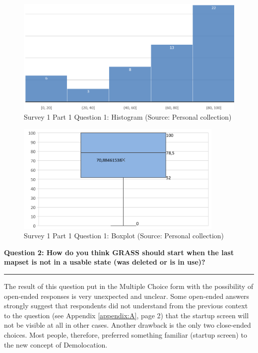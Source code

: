 \documentclass[a4paper,10pt,twoside]{article}
\begin{document}
\begin{figure}[hbt!] 
\begin{center}
\includegraphics[width=12cm]{../surveys/analyzed_data/survey1_part1_question1_excel_histogram.png} 
\caption[Survey 1 Part 1 Question 1: Histogram]{Survey 1 Part 1 Question 1: Histogram (Source: Personal collection)}
\label{fig:survey1_part1_question1_histogram}
\end{center}
\end{figure}

\vspace{0.3cm}
\begin{figure}[hbt!] 
\begin{center}
\includegraphics[width=10cm]{../surveys/analyzed_data/survey1_part1_question1_excel_boxplot.png} 
\caption[Survey 1 Part 1 Question 1: Boxplot]{Survey 1 Part 1 Question 1: Boxplot (Source: Personal collection)}
\label{fig:survey1_part1_question1_boxplot}
\end{center}
\end{figure}

\newpage
\noindent \textbf{Question 2: How do you think GRASS should start when the last mapset is not in a usable state (was deleted or is in use)?}
\par\noindent\rule{\textwidth}{0.4pt}

\noindent The result of this question put in the Multiple Choice form with the possibility of open-ended responses is very unexpected and unclear. Some open-ended answers strongly suggest that respondents did not understand from the previous context to the question (see Appendix \ref{appendix:A}, page 2) that the startup screen will not be visible at all in other cases. Another drawback is the only two close-ended choices. Most people, therefore, preferred something familiar (startup screen) to the new concept of Demolocation.
\end{document}
